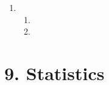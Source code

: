 \begin{enumerate}[noitemsep, label=\textbf{\arabic*}. ]
 \begin{enumerate}[noitemsep, label=\textbf{(\alph*)} ]
\item %
\item %
\item %
\item %
\item %
\end{enumerate}
\item %

 \begin{enumerate}[noitemsep, label=\textbf{(\alph*)} ]
\item %
\item %
\end{enumerate}
\end{enumerate}


\section {9. Statistics}
